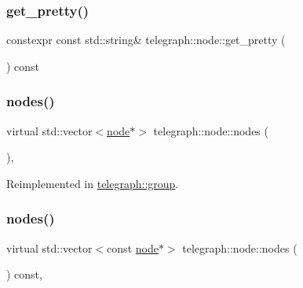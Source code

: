 \mbox{\label{classtelegraph_1_1node_abeaa41162d9369bc6fc8bcbabe9d23e3}} 
\subsubsection{\texorpdfstring{get\+\_\+pretty()}{get\_pretty()}}
{\footnotesize\ttfamily constexpr const std\+::string\& telegraph\+::node\+::get\+\_\+pretty (\begin{DoxyParamCaption}{ }\end{DoxyParamCaption}) const\hspace{0.3cm}{\ttfamily [inline]}}

\mbox{\label{classtelegraph_1_1node_a14eb2051c1efaf4de6684d3e50aebeb7}} 
\subsubsection{\texorpdfstring{nodes()}{nodes()}\hspace{0.1cm}{\footnotesize\ttfamily [1/2]}}
{\footnotesize\ttfamily virtual std\+::vector$<$\hyperlink{classtelegraph_1_1node}{node}$\ast$$>$ telegraph\+::node\+::nodes (\begin{DoxyParamCaption}{ }\end{DoxyParamCaption})\hspace{0.3cm}{\ttfamily [inline]}, {\ttfamily [virtual]}}



Reimplemented in \hyperlink{classtelegraph_1_1group_a120c05f05d045fe4b5719b4abe4e83d9}{telegraph\+::group}.

\mbox{\label{classtelegraph_1_1node_a9d19888a9a73a4623dcab55be6386395}} 
\subsubsection{\texorpdfstring{nodes()}{nodes()}\hspace{0.1cm}{\footnotesize\ttfamily [2/2]}}
{\footnotesize\ttfamily virtual std\+::vector$<$const \hyperlink{classtelegraph_1_1node}{node}$\ast$$>$ telegraph\+::node\+::nodes (\begin{DoxyParamCaption}{ }\end{DoxyParamCaption}) const\hspace{0.3cm}{\ttfamily [inline]}, {\ttfamily [virtual]}}



